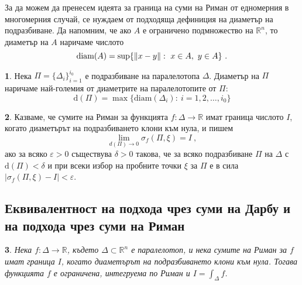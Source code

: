 \documentclass[11pt]{article}
\numberwithin{equation}{section}
\numberwithin{figure}{section}
\numberwithin{table}{section}
\theoremstyle{plain}
\newtheorem{thm}{\protect\theoremname}[section]
\theoremstyle{definition}
\newtheorem{defn}[thm]{\protect\definitionname}
\theoremstyle{remark}
\theoremstyle{definition}
\theoremstyle{remark}
\theoremstyle{plain}
\theoremstyle{definition}
\theoremstyle{definition}
\theoremstyle{plain}
\theoremstyle{plain}
\theoremstyle{plain}
\theoremstyle{definition}
\theoremstyle{plain}
\providecommand{\definitionname}{Дефиниция}
\providecommand{\theoremname}{Теорема}
\DeclarePairedDelimiter\norm{\lVert}{\rVert}
\newcommand*{\R}{\mathbb{R}}
\begin{document}
За да можем да пренесем идеята за граница на суми на Риман от едномерния в многомерния случай, се нуждаем от подходяща дефиниция на диаметър на подразбиване. Да напомним, че ако $A$ е ограничено подмножество на $\R^n$, то 
диаметър на $A$ наричаме числото
 $$\textrm{diam}(A) = \sup\{\norm{x-y}:\ x\in A, \ y\in A\} \ .$$


\begin{defn} Нека $\Pi = \{\Delta_i \}_{i=1}^{i_0}$ е подразбиване на паралелотопа $\Delta$. Диаметър на $\Pi$ наричаме най-големия от диаметрите на паралелотопите от $\Pi$:
$$\textrm{d}(\Pi) = \max\{\textrm{diam}(\Delta_i) : \  i=1,2,\dots ,i_0\}$$
\end{defn}

\begin{defn}
Казваме, че сумите на Риман за функцията $f:\Delta \rightarrow \R$ имат граница числото $I$, когато диаметърът на подразбиването клони към нула, и пишем 
$$\lim_{d(\Pi)\rightarrow 0} \sigma_f(\Pi, \xi)=I \ ,$$
 ако за всяко $\varepsilon >0$ съществува $\delta >0$ такова, че за всяко подразбиване $\Pi$ на $\Delta$ с $\textrm{d}(\Pi)<\delta$ и при всеки избор на пробните точки $\xi$ за $\Pi$ е в сила $\left| \sigma_f(\Pi ,\xi )-I\right| <\varepsilon$.
\end{defn}

\subsection{Еквивалентност на подхода чрез суми на Дарбу и на подхода чрез суми на Риман}

\begin{thm}\label{easy_equivalence}
Нека $f:\Delta\rightarrow\R$, където $\Delta \subset \R^n$ е паралелотоп, и нека сумите на Риман за $f$ имат граница $I$, когато диаметърът на подразбиването клони към нула. Тогава функцията $f$ е ограничена, интегруема по Риман и $I = \int_\Delta f$.
\end{thm}
\end{document}
